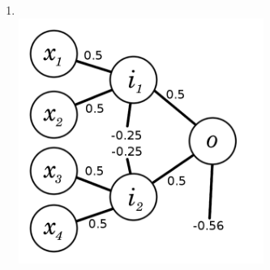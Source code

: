 \documentclass[12pt]{article}
\begin{document}
\begin{enumerate}
\begin{enumerate}
        \item 
            \textcolor{white}{.}\vspace{-12pt}\\
            \includegraphics[width=8cm]{P1b}

    \end{enumerate}
\end{enumerate}
\end{document}
